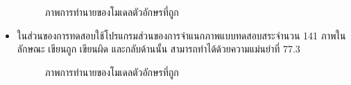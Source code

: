 \documentclass[12pt,oneside,openright,a4paper]{cpe-thai-project}
\begin{document}
\begin{itemize}
\begin{figure}[!h]
    \caption{ภาพการทำนายของโมเดลตัวอักษรที่ถูก}\label{fig:system}                  
   \end{figure}
   \newpage
  \item ในส่วนของการทดสอบใช้โปรแกรมส่วนของการจำแนกภาพแบบทดสอบสระจำนวน 141 ภาพในลักษณะ เขียนถูก เขียนผิด และกลับด้านนั้น สามารถทำได้ด้วยความแม่นยำที่ 77.3%
  \begin{figure}[!h]\centering
    \setlength{\fboxrule}{0.2mm} %
    \setlength{\fboxsep}{1cm}
    \caption{ภาพการทำนายของโมเดลตัวอักษรที่ถูก}\label{fig:system}                  
   \end{figure}
   \begin{figure}[!h]\centering
    \setlength{\fboxrule}{0.2mm} %
    \setlength{\fboxsep}{1cm}

\end{figure}
\end{itemize}
\end{document}
